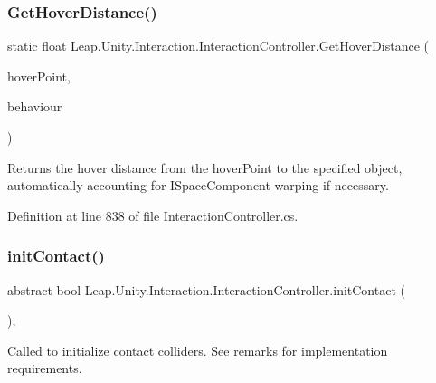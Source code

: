 \subsubsection{\texorpdfstring{GetHoverDistance()}{GetHoverDistance()}}
{\footnotesize\ttfamily static float Leap.\+Unity.\+Interaction.\+Interaction\+Controller.\+Get\+Hover\+Distance (\begin{DoxyParamCaption}\item[{Vector3}]{hover\+Point,  }\item[{\mbox{\hyperlink{interface_leap_1_1_unity_1_1_interaction_1_1_i_interaction_behaviour}{I\+Interaction\+Behaviour}}}]{behaviour }\end{DoxyParamCaption})\hspace{0.3cm}{\ttfamily [static]}}



Returns the hover distance from the hover\+Point to the specified object, automatically accounting for I\+Space\+Component warping if necessary. 



Definition at line 838 of file Interaction\+Controller.\+cs.

\mbox{\label{class_leap_1_1_unity_1_1_interaction_1_1_interaction_controller_a5d9713dd48f3093aefbd8ebbba3b0251}} 
\subsubsection{\texorpdfstring{initContact()}{initContact()}}
{\footnotesize\ttfamily abstract bool Leap.\+Unity.\+Interaction.\+Interaction\+Controller.\+init\+Contact (\begin{DoxyParamCaption}{ }\end{DoxyParamCaption})\hspace{0.3cm}{\ttfamily [protected]}, {}}



Called to initialize contact colliders. See remarks for implementation requirements. 

